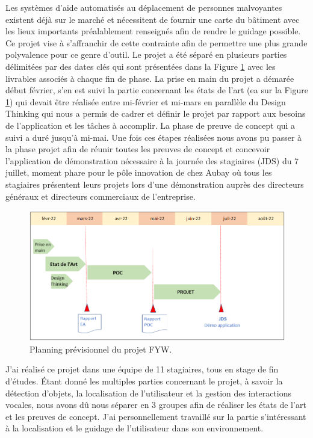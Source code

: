 \documentclass[11pt]{article}
\begin{document}
    Les systèmes d'aide automatisés au déplacement de personnes malvoyantes existent déjà sur le marché et nécessitent de fournir une 
    carte du bâtiment avec les lieux importants préalablement renseignés afin de rendre le guidage possible. Ce projet vise à s'affranchir 
    de cette contrainte afin de permettre une plus grande polyvalence pour ce genre d'outil.
    Le projet a été séparé en plusieurs parties délimitées par des dates clés qui sont présentées dans la Figure \ref{fig:Planning} 
    avec les livrables associés à chaque fin de phase.
    La prise en main du projet a démarée début février, s'en est suivi la partie concernant les états de l'art (\acrshort{ea} sur la Figure \ref{fig:Planning}) 
    qui devait être réalisée entre mi-février et mi-mars en parallèle du Design Thinking qui nous a permis de cadrer et définir le projet par 
    rapport aux besoins de l'application et les tâches à accomplir. La phase de preuve de concept qui a suivi a duré jusqu'à mi-mai. 
    Une fois ces étapes réalisées nous avons pu passer à la phase projet afin de réunir toutes les preuves de concept et concevoir l'application 
    de démonstration nécessaire à la journée des stagiaires (JDS) du 7 juillet, moment phare pour le pôle innovation de chez Aubay où tous 
    les stagiaires présentent leurs projets lors d'une démonstration auprès des directeurs généraux et directeurs commerciaux de l'entreprise.

    \begin{figure}[hbt]  
      \includegraphics[width=\textwidth]{Planning.png}    
      \caption{Planning prévisionnel du projet FYW.}
      \label{fig:Planning}
    \end{figure}  
    
    J'ai réalisé ce projet dans une équipe de 11 stagiaires, tous en stage de fin d'études. Étant donné les multiples parties concernant le projet, 
    à savoir la détection d'objets, la localisation de l'utilisateur et la gestion des interactions vocales, nous avons dû nous séparer en 3 
    groupes afin de réaliser les états de l'art et les preuves de concept. J'ai personnellement travaillé sur la partie s'intéressant à la 
    localisation et le guidage de l'utilisateur dans son environnement. 
    
\end{document}

